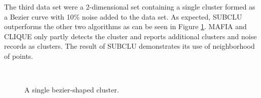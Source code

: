 The third data set were a 2-dimensional set containing a single cluster formed as a Bezier curve with 10\% noise added to the data set. As expected, SUBCLU outperforms the other two algorithms as can be seen in Figure \ref{fig:accuracy_bezier}. MAFIA and CLIQUE only partly detects the cluster and reports additional clusters and noise records as clusters. The result of SUBCLU demonstrates its use of neighborhood of points.
\begin{figure}[H]
    \vspace*{-0.5cm}
    \centering
    ~~~~
    ~~~~
    \caption{A single bezier-shaped cluster.}
    \label{fig:accuracy_bezier}
\end{figure}

